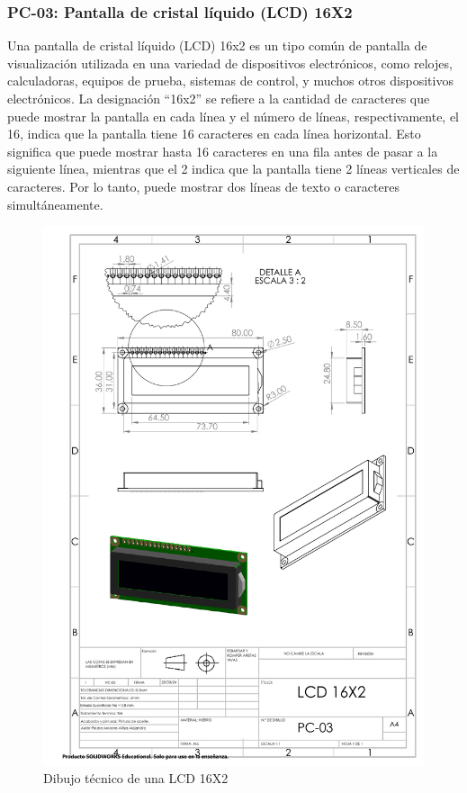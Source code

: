     \subsubsection{PC-03: Pantalla de cristal líquido (LCD) 16X2}
    
    Una pantalla de cristal líquido (LCD) 16x2 es un tipo común de pantalla de visualización utilizada en una variedad de dispositivos electrónicos, como relojes, calculadoras, equipos de prueba, sistemas de control, y muchos otros dispositivos electrónicos. La designación “16x2” se refiere a la cantidad de caracteres que puede mostrar la pantalla en cada línea y el número de líneas, respectivamente, el 16, indica que la pantalla tiene 16 caracteres en cada línea horizontal. Esto significa que puede mostrar hasta 16 caracteres en una fila antes de pasar a la siguiente línea, mientras que el 2 indica que la pantalla tiene 2 líneas verticales de caracteres. Por lo tanto, puede mostrar dos líneas de texto o caracteres simultáneamente.
    \begin{figure}[H]
        \centering
        \includegraphics[trim = {7mm 1mm 1mm 1mm},clip,scale=0.4]{22/Img/lcdDibujo.PDF}
        \caption{Dibujo técnico de una LCD 16X2}
        \label{fig:lcd}
    \end{figure}
    

